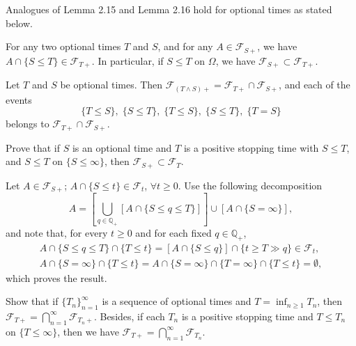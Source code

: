 \documentclass{report}
\begin{document}
\begin{prob}
	Analogues of Lemma 2.15 and Lemma 2.16 hold for optional times as stated below.
	\begin{lem}[\( \bm{2.15'} \)]
		For any two optional times \( T \) and \( S \), and for any \( A\in \mathscr{F}_{S+} \),
		we have \( A\cap\{S\le T\}\in \mathscr{F}_{T+} \). In particular, if \( S\le T \) on \( \Omega \), we have
		\( \mathscr{F}_{S+}\subset \mathscr{F}_{T+} \).
	\end{lem}
	\begin{lem}[\( \bm{2.16'} \)]
		Let \( T \) and \( S \) be optional times.
		Then \( \mathscr{F}_{(T\wedge S)+}=\mathscr{F}_{T+}\cap \mathscr{F}_{S+} \), and each of the events
		\[\{T\le S\},\;\{S\le T\},\; \{T\le S\},\; \{S\le T\},\; \{T=S\}\]
		belongs to \( \mathscr{F}_{T+}\cap \mathscr{F}_{S+} \).
	\end{lem}
\end{prob}
\setcounter{exe}{21}
\begin{prob}[continued]
	Prove that if \( S \) is an optional time and \( T \) is a positive stopping time with
	\( S\le T \), and \( S\le T \) on \( \{S\le \infty \} \), then \( \mathscr{F}_{S+}\subset \mathscr{F}_T \).
\end{prob}
\begin{prf}
	Let \( A\in \mathscr{F}_{S+} \); \( A\cap \{ S\le t\}\in \mathscr{F}_t \), \( \forall t\ge0 \).
	Use the following decomposition 
	\[
		A=[\bigcup_{q\in \mathbb{Q}_{+}}[A\cap \{S\le q\le T\}]]
		\cup
		[A \cap \{{S=\infty}\}],
	\]
	and note that,
	for every \( t\ge0 \) and for each fixed \( q\in \mathbb{Q}_{+} \),
	\begin{gather*}
		A \cap \{ S \le q\le T \} \cap \{T\le t\} = [ A \cap \{ S \le q \} ] \cap \{ t \ge T\gg q\}\in \mathscr{F}_t,\\
		A \cap \{ S = \infty \} \cap \{ T \le t \} = A \cap \{ S = \infty \} \cap \{ T = \infty \} \cap \{ T \le t\} = \emptyset,
	\end{gather*}
	which proves the result.
\end{prf}
\setcounter{exe}{22}
\begin{prob}
	Show that if \( \{T_n \}_{n=1}^{\infty} \) is a sequence of optional times and \( T=\inf_{n\ge 1} T_n \),
	then \( \mathscr{F}_{T+}=\bigcap_{n=1}^{\infty}\mathscr{F}_{T_n+} \).
	Besides, if each \( T_n \) is a positive stopping time and \( T\le T_n \) on \( \{T\le \infty \} \),
	then we have \( \mathscr{F}_{T+}=\bigcap_{n=1}^{\infty}\mathscr{F}_{T_n} \). 
\end{prob}
\end{document}

